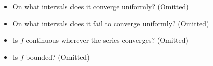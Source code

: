 \begin{Exercise}
	\begin{itemize}
		\item On what intervals does it converge uniformly? (Omitted)
	\end{itemize}
	
	\begin{itemize}
		\item On what intervals does it fail to converge uniformly? (Omitted)
	\end{itemize}
	
	\begin{itemize}
		\item Is $f$ continuous wherever the series converges? (Omitted)
	\end{itemize}
	
	\begin{itemize}
		\item Is $f$ bounded? (Omitted)
	\end{itemize}
\end{Exercise}